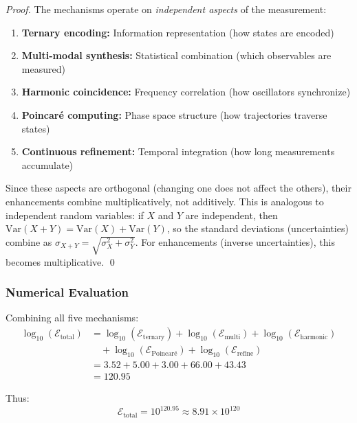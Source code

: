 \documentclass[twocolumn,10pt]{article}
\theoremstyle{remark}
\begin{document}
\begin{proof}
The mechanisms operate on \textit{independent aspects} of the measurement:

\begin{enumerate}
    \item \textbf{Ternary encoding:} Information representation (how states are encoded)
    \item \textbf{Multi-modal synthesis:} Statistical combination (which observables are measured)
    \item \textbf{Harmonic coincidence:} Frequency correlation (how oscillators synchronize)
    \item \textbf{Poincaré computing:} Phase space structure (how trajectories traverse states)
    \item \textbf{Continuous refinement:} Temporal integration (how long measurements accumulate)
\end{enumerate}

Since these aspects are orthogonal (changing one does not affect the others), their enhancements combine multiplicatively, not additively. This is analogous to independent random variables: if $X$ and $Y$ are independent, then $\text{Var}(X + Y) = \text{Var}(X) + \text{Var}(Y)$, so the standard deviations (uncertainties) combine as $\sigma_{X+Y} = \sqrt{\sigma_X^2 + \sigma_Y^2}$. For enhancements (inverse uncertainties), this becomes multiplicative.
\qed
\end{proof}

\subsubsection{Numerical Evaluation}

Combining all five mechanisms:
\begin{align}
    \log_{10}(\mathcal{E}_{\text{total}}) &= \log_{10}(\mathcal{E}_{\text{ternary}}) + \log_{10}(\mathcal{E}_{\text{multi}}) + \log_{10}(\mathcal{E}_{\text{harmonic}}) \nonumber \\
    &\quad + \log_{10}(\mathcal{E}_{\text{Poincaré}}) + \log_{10}(\mathcal{E}_{\text{refine}}) \label{eq:total_log} \\
    &= 3.52 + 5.00 + 3.00 + 66.00 + 43.43 \nonumber \\
    &= 120.95 \label{eq:total_log_numerical}
\end{align}

Thus:
\begin{equation}
    \mathcal{E}_{\text{total}} = 10^{120.95} \approx 8.91 \times 10^{120}
    \label{eq:total_enhancement_final}
\end{equation}
\end{document}
